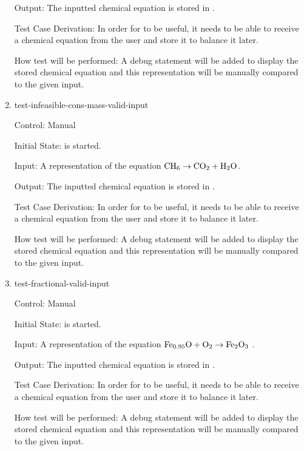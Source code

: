\documentclass[12pt, titlepage]{article}
\begin{document}
\begin{enumerate}
  Output: The inputted chemical equation is stored in \progname{}.

  Test Case Derivation: In order for \progname{} to be useful, it needs to be
  able to receive a chemical equation from the user and store it to balance it
  later.

  How test will be performed: A debug statement will be added to display the
  stored chemical equation and this representation will be manually compared to
  the given input.

  \item{test-infeasible-cons-mass-valid-input\\}

  Control: Manual

  Initial State: \progname{} is started.

  Input: A representation of the equation
  $\ce{CH6} \rightarrow \ce{CO2} + \ce{H2O}$.

  Output: The inputted chemical equation is stored in \progname{}.

  Test Case Derivation: In order for \progname{} to be useful, it needs to be
  able to receive a chemical equation from the user and store it to balance it
  later.

  How test will be performed: A debug statement will be added to display the
  stored chemical equation and this representation will be manually compared to
  the given input.

  \item{test-fractional-valid-input\\}

  Control: Manual

  Initial State: \progname{} is started.

  Input: A representation of the equation
  $\ce{Fe_{0.95}O} + \ce{O2} \rightarrow \ce{Fe2O3}$
  \cite{doubtnut_when_nodate}.

  Output: The inputted chemical equation is stored in \progname{}.

  Test Case Derivation: In order for \progname{} to be useful, it needs to be
  able to receive a chemical equation from the user and store it to balance it
  later.

  How test will be performed: A debug statement will be added to display the
  stored chemical equation and this representation will be manually compared to
  the given input.

\end{enumerate}
\end{document}

